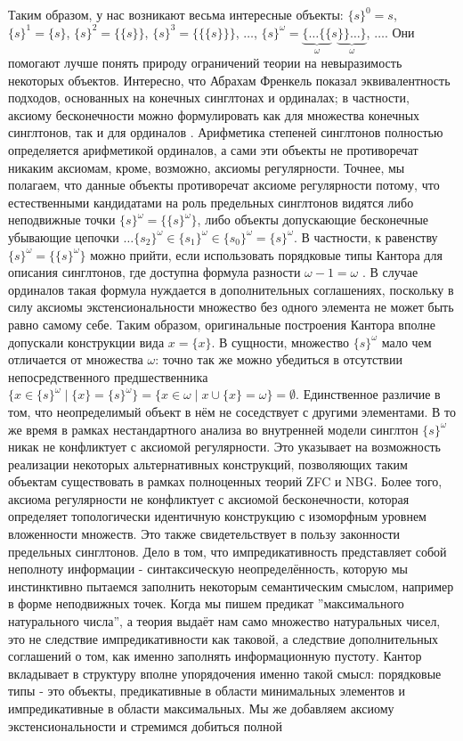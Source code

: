 \documentclass[12pt]{article}
\begin{document}
Таким образом, у нас возникают весьма интересные объекты: $\{ s \}^0 = s$, $\{ s \}^1 = \{ s \}$, $\{ s \}^2 = \{\{ s \}\}$, $\{ s \}^3 = \{\{\{ s \}\}\}$, $\dots$, $\{ s \}^{\omega} = \underbrace{\{\dots\{\{}_{\omega} s \underbrace{\}\}\dots\}}_{\omega}$, $\dots$. Они помогают лучше понять природу ограничений теории на невыразимость некоторых объектов. Интересно, что Абрахам Френкель показал эквивалентность подходов, основанных на конечных синглтонах и ординалах; в частности, аксиому бесконечности можно формулировать как для множества конечных синглтонов, так и для ординалов \cite{fraenkel-singleton-ordinal-equivalence}. Арифметика степеней синглтонов полностью определяется арифметикой ординалов, а сами эти объекты не противоречат никаким аксиомам, кроме, возможно, аксиомы регулярности. Точнее, мы полагаем, что данные объекты противоречат аксиоме регулярности потому, что естественными кандидатами на роль предельных синглтонов видятся либо неподвижные точки $\{ s \}^{\omega} = \{ \{ s \}^{\omega} \}$, либо объекты допускающие бесконечные убывающие цепочки $\dots \{ s_2 \}^{\omega} \in \{ s_1 \}^{\omega} \in \{ s_0 \}^{\omega} = \{ s \}^{\omega}$. В частности, к равенству $\{ s \}^{\omega} = \{\{ s \}^{\omega}\}$ можно прийти, если использовать порядковые типы Кантора для описания синглтонов, где доступна формула разности $\omega - 1 = \omega$ \cite{cantor-limit-minus}. В случае ординалов такая формула нуждается в дополнительных соглашениях, поскольку в силу аксиомы экстенсиональности множество без одного элемента не может быть равно самому себе. Таким образом, оригинальные построения Кантора вполне допускали конструкции вида $x = \{ x \}$. В сущности, множество $\{ s \}^{\omega}$ мало чем отличается от множества $\omega$: точно так же можно убедиться в отсутствии непосредственного предшественника $\{ x \in \{ s \}^{\omega} \mid \{ x \} = \{ s \}^{\omega} \} = \{ x \in \omega \mid x \cup \{ x \} = \omega \} = \emptyset$. Единственное различие в том, что неопределимый объект в нём не соседствует с другими элементами. В то же время в рамках нестандартного анализа во внутренней модели синглтон $\{ s \}^{\omega}$ никак не конфликтует с аксиомой регулярности. Это указывает на возможность реализации некоторых альтернативных конструкций, позволяющих таким объектам существовать в рамках полноценных теорий ZFC и NBG. Более того, аксиома регулярности не конфликтует с аксиомой бесконечности, которая определяет топологически идентичную конструкцию с изоморфным уровнем вложенности множеств. Это также свидетельствует в пользу законности предельных синглтонов. Дело в том, что импредикативность представляет собой неполноту информации - синтаксическую неопределённость, которую мы инстинктивно пытаемся заполнить некоторым семантическим смыслом, например в форме неподвижных точек. Когда мы пишем предикат ''максимального натурального числа'', а теория выдаёт нам само множество натуральных чисел, это не следствие импредикативности как таковой, а следствие дополнительных соглашений о том, как именно заполнять информационную пустоту. Кантор вкладывает в структуру вполне упорядочения именно такой смысл: порядковые типы - это объекты, предикативные в области минимальных элементов и импредикативные в области максимальных. Мы же добавляем аксиому экстенсиональности и стремимся добиться полной 
\end{document}
